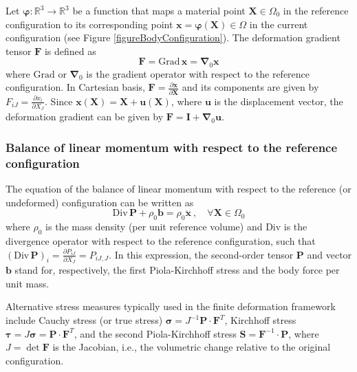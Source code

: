 \documentclass[oneside,11pt,times]{book}
\begin{document}
Let $\bm{\varphi}:\mathbb{R}^3 \rightarrow \mathbb{R}^3$ be a function that maps a material point $\bm{X} \in \Omega_0$ in the reference configuration to its corresponding point $\bm{x} = \bm{\varphi}(\bm{X}) \in \Omega$ in the current configuration (see Figure \ref{figureBodyConfiguration}). The deformation gradient tensor  $\bm{F}$  is defined as
%
\begin{equation} \label{equationDeformationGradient}
 \bm{F} = \text{Grad} \, \bm{x} = \bm{\nabla}\!_0 \bm{x}
\end{equation}
%
where $\text{Grad}$ or $\bm{\nabla}\!_0$ is the gradient operator with respect to the reference configuration. In Cartesian basis, $\bm{F} = \frac{\partial \bm{x}}{\partial \bm{X}}$ and its components are given by $F_{iJ} = \frac{\partial x_i}{\partial X_J}$. Since $\bm{x}(\bm{X}) = \bm{X} + \bm{u}(\bm{X})$, where $\bm{u}$ is the displacement vector, the deformation gradient can be given by $\bm{F} = \bm{I} + \bm{\nabla}\!_0 \bm{u}$.

\subsubsection{Balance of linear momentum with respect to the reference configuration}
 \label{subsectionBalanceMomentum}

The equation of the balance of linear momentum with respect to the reference (or undeformed) configuration can be
written as
%
\begin{equation} \label{equationLocalBalanceMomentum}
 \text{Div} \, \bm{P} + \rho_0  \bm{b} = \rho_0 \ddot{\bm{x}} \: , \quad \forall \bm{X} \in \Omega_0
\end{equation}
%
where  $\rho_0$ is the mass density (per unit reference volume) and $\text{Div}$ is the divergence operator with respect to the reference configuration, such that $ (\text{Div} \, \bm{P})_{i} = \frac{\partial P_{iJ}}{\partial X_J} = P_{iJ,J}$. In this expression, the second-order tensor $\bm{P}$ and vector $\bm{b}$ stand for, respectively, the first Piola-Kirchhoff stress and the body force per unit mass.

Alternative stress measures typically used in the finite deformation framework include Cauchy stress (or true stress) $\bm{\sigma} = J^{-1} \bm{P} \cdot \bm{F}^{T}$, Kirchhoff stress $\bm{\tau} = J \bm{\sigma} = \bm{P} \cdot \bm{F}^{T}$, and the second Piola-Kirchhoff stress $\bm{S} = \bm{F}^{-1} \cdot \bm{P}$, where $J = \det \bm{F}$ is the Jacobian, i.e., the volumetric change relative to the original configuration.
\end{document}
